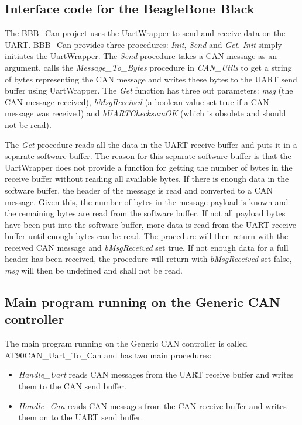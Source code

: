 \subsection{Interface code for the BeagleBone Black}
The BBB\_Can project uses the UartWrapper to send and receive data on the UART. BBB\_Can provides three procedures: \emph{Init}, \emph{Send} and \emph{Get}. \newline
\emph{Init} simply initiates the UartWrapper. \newline
The \emph{Send} procedure takes a CAN message as an argument, calls the \emph{Message\_To\_Bytes} procedure in \emph{CAN\_Utils} to get a string of bytes representing the CAN message and writes these bytes to the UART send buffer using UartWrapper. \newline
The \emph{Get} function has three out parameters: \emph{msg} (the CAN message received), \emph{bMsgReceived} (a boolean value set true if a CAN message was received) and \emph{bUARTChecksumOK} (which is obsolete and should not be read). 

The \emph{Get} procedure reads all the data in the UART receive buffer and puts it in a separate software buffer. The reason for this separate software buffer is that the UartWrapper does not provide a function for getting the number of bytes in the receive buffer without reading all available bytes. \newline
If there is enough data in the software buffer, the header of the message is read and converted to a CAN message. Given this, the number of bytes in the message payload is known and the remaining bytes are read from the software buffer. If not all payload bytes have been put into the software buffer, more data is read from the UART receive buffer until enough bytes can be read. The procedure will then return with the received CAN message and \emph{bMsgReceived} set true. \newline
If not enough data for a full header has been received, the procedure will return with \emph{bMsgReceived} set false, \emph{msg} will then be undefined and shall not be read.


\subsection{Main program running on the Generic CAN controller}
The main program running on the Generic CAN controller is called AT90CAN\_Uart\_To\_Can and has two main procedures:

\begin{itemize}
   \item { \em Handle\_Uart}
   reads CAN messages from the UART receive buffer and writes them to the CAN send buffer.
   \item { \em Handle\_Can}
   reads CAN messages from the CAN receive buffer and writes them on to the UART send buffer.
\end{itemize}


